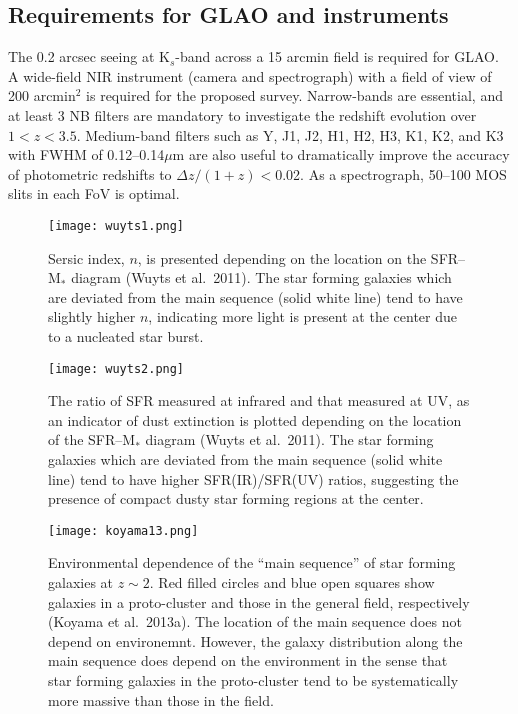 \subsection{Requirements for GLAO and instruments}

The 0.2 arcsec seeing at K$_s$-band across a 15 arcmin field is required for GLAO.
A wide-field NIR instrument (camera and spectrograph) with a field of view of
200 arcmin$^2$ is required for the proposed survey.
Narrow-bands are essential, and at least 3 NB filters are mandatory to investigate
the redshift evolution over $1<z<3.5$.
Medium-band filters such as Y, J1, J2, H1, H2, H3, K1, K2, and K3 
with FWHM of 0.12--0.14$\mu$m are also useful
to dramatically improve the accuracy of photometric redshifts to $\Delta$$z/(1+z)$$<$0.02.
As a spectrograph, 50--100 MOS slits in each FoV is optimal.

\begin{figure}%
\centerline{
\texttt{[image: wuyts1.png]}
}
\caption{
Sersic index, $n$, is presented depending on the location on the SFR--M$_{*}$ diagram
(Wuyts et al.\ 2011). The star forming galaxies which are deviated from the main sequence
(solid white line) tend to have slightly higher $n$, indicating more light is present
at the center due to a nucleated star burst.
}
\label{fig:}
\end{figure}

\begin{figure}%
\centerline{
\texttt{[image: wuyts2.png]}
}
\caption{
The ratio of SFR measured at infrared and that measured at UV, as an indicator of dust extinction
is plotted depending on the location of the SFR--M$_{*}$ diagram (Wuyts et al.\ 2011). 
The star forming galaxies which are deviated from the main sequence
(solid white line) tend to have higher SFR(IR)/SFR(UV) ratios, suggesting
the presence of compact dusty star forming regions at the center.
}
\label{fig:}
\end{figure}


\begin{figure}%
\centerline{
\texttt{[image: koyama13.png]}
}
\caption{
Environmental dependence of the ``main sequence'' of star forming galaxies at $z\sim2$.
Red filled circles and blue open squares show galaxies in a proto-cluster and those
in the general field, respectively (Koyama et al.\ 2013a).
The location of the main sequence does not depend on environemnt. However, the galaxy
distribution along the main sequence does depend on the environment in the sense that
star forming galaxies in the proto-cluster tend to be systematically more massive than
those in the field.
}
\label{fig:}
\end{figure}

